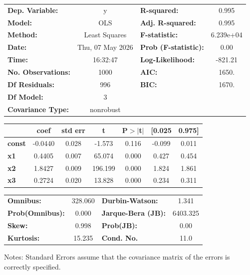 \begin{center}
\begin{tabular}{lclc}
\toprule
\textbf{Dep. Variable:}    &        y         & \textbf{  R-squared:         } &     0.995   \\
\textbf{Model:}            &       OLS        & \textbf{  Adj. R-squared:    } &     0.995   \\
\textbf{Method:}           &  Least Squares   & \textbf{  F-statistic:       } & 6.239e+04   \\
\textbf{Date:}             & Thu, 07 May 2026 & \textbf{  Prob (F-statistic):} &     0.00    \\
\textbf{Time:}             &     16:32:47     & \textbf{  Log-Likelihood:    } &   -821.21   \\
\textbf{No. Observations:} &        1000      & \textbf{  AIC:               } &     1650.   \\
\textbf{Df Residuals:}     &         996      & \textbf{  BIC:               } &     1670.   \\
\textbf{Df Model:}         &           3      & \textbf{                     } &             \\
\textbf{Covariance Type:}  &    nonrobust     & \textbf{                     } &             \\
\bottomrule
\end{tabular}
\begin{tabular}{lcccccc}
               & \textbf{coef} & \textbf{std err} & \textbf{t} & \textbf{P$> |$t$|$} & \textbf{[0.025} & \textbf{0.975]}  \\
\midrule
\textbf{const} &      -0.0440  &        0.028     &    -1.573  &         0.116        &       -0.099    &        0.011     \\
\textbf{x1}    &       0.4405  &        0.007     &    65.074  &         0.000        &        0.427    &        0.454     \\
\textbf{x2}    &       1.8427  &        0.009     &   196.199  &         0.000        &        1.824    &        1.861     \\
\textbf{x3}    &       0.2724  &        0.020     &    13.828  &         0.000        &        0.234    &        0.311     \\
\bottomrule
\end{tabular}
\begin{tabular}{lclc}
\textbf{Omnibus:}       & 328.060 & \textbf{  Durbin-Watson:     } &    1.341  \\
\textbf{Prob(Omnibus):} &   0.000 & \textbf{  Jarque-Bera (JB):  } & 6403.325  \\
\textbf{Skew:}          &   0.998 & \textbf{  Prob(JB):          } &     0.00  \\
\textbf{Kurtosis:}      &  15.235 & \textbf{  Cond. No.          } &     11.0  \\
\bottomrule
\end{tabular}
\end{center}

Notes: \newline
 [1] Standard Errors assume that the covariance matrix of the errors is correctly specified.